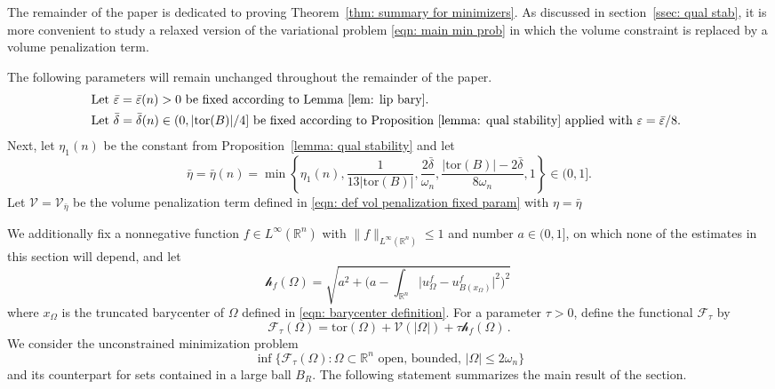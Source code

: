 \documentclass[10pt, reqno]{amsart}
\numberwithin{equation}{section}
\def\R{{\mathbb R}}
\def\e{\varepsilon}
\def\W{\Omega}
\def\om{\omega}
\def\tor{\mathrm{tor}}
\def\fvbar{\mathscr{V}}
\def\err{\tau}
\def\Ep{\mathcal{F}_{\err}}
\def\nl{\mathscr{h}_f}
\def\baryEps{\bar{\e}}
\def\ccdel{\bar{\delta}}
\begin{document}
The remainder of the paper is dedicated to proving Theorem~\ref{thm: summary for minimizers}. 
As discussed in section~\ref{ssec: qual stab}, it is more convenient to study a relaxed version of the variational problem \eqref{eqn: main min prob} in which the volume constraint is replaced by a volume penalization term. 

The following  parameters will remain unchanged throughout the remainder of the paper.
\begin{equation}\label{eqn: parameter fix}
\begin{split}
&	\mbox{Let $\baryEps= \baryEps(n) >0$ be fixed according to Lemma~\ref{lem: lip bary}. } \\
&	\mbox{Let $\ccdel= \ccdel(n) \in (0, |\tor(B)|/4]$ be fixed according to Proposition~\ref{lemma: qual stability} applied with $\e = \baryEps/8$. } 
\end{split}
\end{equation}
Next, let $\eta_1(n)$ be the constant from Proposition~\ref{lemma: qual stability} and let
\begin{equation}
    \label{eqn: eta bar fix}
\bar{\eta}= \bar{\eta}(n) = \min\left\{ \eta_1(n),  \frac{1}{13|\tor(B)|}, \frac{ 2\bar{\delta}}{\om_n },  \frac{|\tor(B)|-2\bar{\delta}}{8\om_n}, 1\right\} \in(0,1].
\end{equation}
Let $\fvbar =\mathscr{V}_{\bar{\eta}} $ be the volume penalization term defined in \eqref{eqn: def vol penalization fixed param} with $\eta = \bar{\eta}$



We additionally fix a nonnegative function $f \in L^\infty(\R^n)$ with $\| f \|_{L^\infty(\R^n)}\leq 1$ and number $a\in (0,1]$, on which none of the estimates in this section will depend, and let 
\begin{equation}\label{eqn: SP nl}
\nl(\W) = \sqrt{a^2 +  \Big(a - \int_{\R^n} \big|u_\W^f - u_{B(x_\W)}^f\big|^2\Big)^2 }\,
\end{equation}
where $x_\W$ is the truncated barycenter of $\W$ defined in \eqref{eqn: barycenter definition}. For a parameter $\tau>0$,  define the functional $\Ep$ by
\begin{equation}\label{eqn: main functional}
\Ep(\W)   = \tor(\W) + \fvbar(|\W|)+ \err \nl(\W) \,.
\end{equation}
We consider the unconstrained minimization problem 
\begin{equation}
	\label{eqn: MAIN min prob}
	\inf \{{\Ep}(\W) : \W \subset \R^n \text{ open, bounded, } |\W| \leq 2\omega_n\}
\end{equation}
and its counterpart for sets contained in a large ball $B_R$.
The following statement summarizes the main result of the section.
\end{document}
